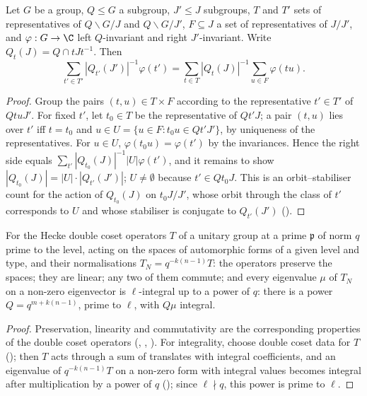 \begin{lemma}\label{pf:stageU:classrefine}
Let $G$ be a group, $Q\le G$ a subgroup, $J'\le J$ subgroups, $T$ and $T'$ sets of representatives of $Q\backslash G/J$ and $Q\backslash G/J'$,
$F\subseteq J$ a set of representatives of $J/J'$, and $\varphi:G\to\C$ left $Q$-invariant and right $J'$-invariant. Write
$Q_t(J)=Q\cap tJt^{-1}$. Then
\[
\sum_{t'\in T'}|Q_{t'}(J')|^{-1}\varphi(t')=\sum_{t\in T}|Q_t(J)|^{-1}\sum_{u\in F}\varphi(tu).
\]
\end{lemma}

\begin{proof}
Group the pairs $(t,u)\in T\times F$ according to the representative $t'\in T'$ of $Qtu J'$. For fixed $t'$, let $t_0\in T$ be the
representative of $Qt'J$; a pair $(t,u)$ lies over $t'$ iff $t=t_0$ and $u\in U=\{u\in F:t_0u\in Qt'J'\}$, by uniqueness of the
representatives. For $u\in U$, $\varphi(t_0u)=\varphi(t')$ by the invariances. Hence the right side equals
$\sum_{t'}|Q_{t_0}(J)|^{-1}|U|\varphi(t')$, and it remains to show $|Q_{t_0}(J)|=|U|\cdot|Q_{t'}(J')|$; $U\ne\emptyset$ because $t'\in Q t_0J$. This
is an orbit--stabiliser count for the action of $Q_{t_0}(J)$ on $t_0J/J'$, whose orbit through the class of $t'$ corresponds to $U$
and whose stabiliser is conjugate to $Q_{t'}(J')$ ().
\end{proof}

\begin{lemma}\label{pf:stageU:heckestd}
For the Hecke double coset operators $T$ of a unitary group at a prime $\mathfrak p$ of norm $q$ prime to the level, acting on the
spaces of automorphic forms of a given level and type, and their normalisations $T_N=q^{-k(n-1)}T$: the operators preserve the
spaces; they are linear; any two of them commute; and every eigenvalue $\mu$ of $T_N$ on a non-zero eigenvector is $\ell$-integral
up to a power of $q$: there is a power $Q=q^{m+k(n-1)}$, prime to $\ell$, with $Q\mu$ integral.
\end{lemma}

\begin{proof}
Preservation, linearity and commutativity are the corresponding properties of the double coset operators
(, ,
). For integrality, choose double coset data for $T$
(); then $T$ acts through a sum of translates with integral coefficients, and an
eigenvalue of $q^{-k(n-1)}T$ on a non-zero form with integral values becomes integral after multiplication by a power of $q$
(); since $\ell\nmid q$, this power is prime to $\ell$.
\end{proof}

